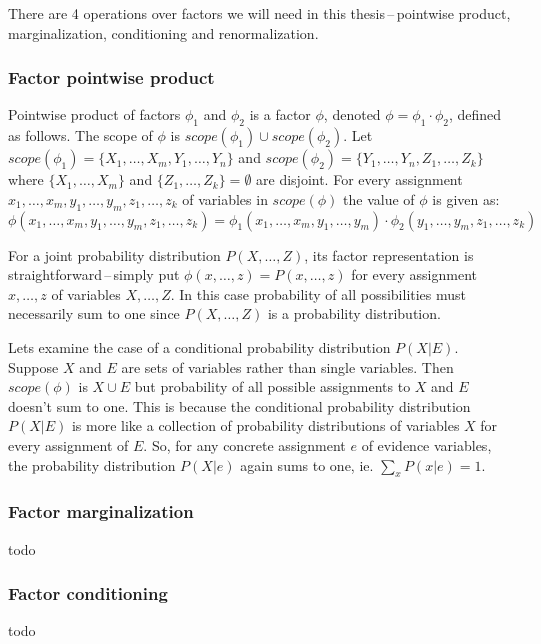 \documentclass[english,cover]{fitthesis} %
\newcommand{\todo}[1]{{\color{red} #1}}
\begin{document}
There are 4 operations over factors we will need in this thesis\,--\,pointwise product, marginalization, conditioning and renormalization.

\subsubsection{Factor pointwise product}
Pointwise product of factors $\phi_1$ and $\phi_2$ is a factor $\phi$, denoted $\phi = \phi_1 \cdot \phi_2$, defined as follows. The scope of $\phi$ is $scope(\phi_1) \cup scope(\phi_2)$. Let $scope(\phi_1) = \lbrace X_1, \dots, X_m, Y_1, \dots, Y_n \rbrace$ and $scope(\phi_2) = \lbrace Y_1, \dots, Y_n, Z_1, \dots, Z_k \rbrace$ where $\lbrace X_1, \dots, X_m \rbrace$ and $\lbrace Z_1, \dots, Z_k \rbrace = \emptyset$ are disjoint. For every assignment $x_1, \dots, x_m, y_1, \dots, y_m, z_1, \dots, z_k$ of variables in $scope(\phi)$ the value of $\phi$ is given as:
$$\phi(x_1, \dots, x_m, y_1, \dots, y_m, z_1, \dots, z_k)
= \phi_1(x_1, \dots, x_m, y_1, \dots, y_m) \cdot \phi_2(y_1, \dots, y_m, z_1, \dots, z_k)
$$

For a joint probability distribution $P(X,\dots,Z)$, its factor representation is straightforward\,--\,simply put $\phi(x,\dots,z) = P(x,\dots,z)$ for every assignment $x,\dots,z$ of variables $X,\dots,Z$. In this case probability of all possibilities must necessarily sum to one since $P(X,\dots,Z)$ is a probability distribution.

Lets examine the case of a conditional probability distribution $P(X|E)$. Suppose $X$ and $E$ are sets of variables rather than single variables. Then $scope(\phi)$ is $X \cup E$ but probability of all possible assignments to $X$ and $E$ doesn't sum to one. This is because the conditional probability distribution $P(X|E)$ is more like a collection of probability distributions of variables $X$ for every assignment of $E$. So, for any concrete assignment $e$ of evidence variables, the probability distribution $P(X|e)$ again sums to one, ie. $\sum_x P(x|e) = 1$.

\subsubsection{Factor marginalization}
\todo{todo}

\subsubsection{Factor conditioning}
\todo{todo}
\end{document}
